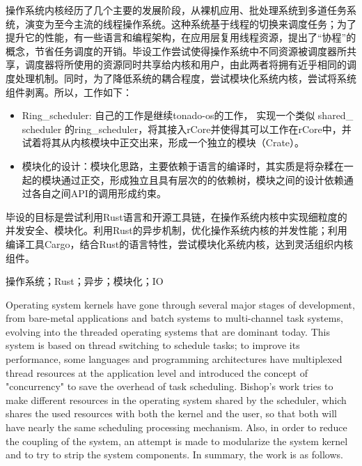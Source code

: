 \setlength{\headheight}{1.5cm}

\abstractcn


操作系统内核经历了几个主要的发展阶段，从裸机应用、批处理系统到多道任务系统，演变为至今主流的线程操作系统。这种系统基于线程的切换来调度任务；为了提升它的性能，有一些语言和编程架构，在应用层复用线程资源，提出了“协程”的概念，节省任务调度的开销。毕设工作尝试使得操作系统中不同资源被调度器所共享，调度器将所使用的资源同时共享给内核和用户，由此两者将拥有近乎相同的调度处理机制。同时，为了降低系统的耦合程度，尝试模块化系统内核，尝试将系统组件剥离。所以，工作如下：

\begin{itemize}
\item Ring\_scheduler: 自己的工作是继续tonado-os的工作， 实现一个类似 shared\_ scheduler 的ring\_scheduler，将其接入rCore并使得其可以工作在rCore中，并试着将其从内核模块中正交出来，形成一个独立的模块（Crate）。 

\item 模块化的设计：模块化思路，主要依赖于语言的编译时，其实质是将杂糅在一起的模块通过正交，形成独立且具有层次的的依赖树，模块之间的设计依赖通过各自之间API的调用形成约束。
\end{itemize}


毕设的目标是尝试利用Rust语言和开源工具链，在操作系统内核中实现细粒度的并发安全、模块化。利用Rust的异步机制，优化操作系统内核的并发性能；利用编译工具Cargo，结合Rust的语言特性，尝试模块化系统内核，达到灵活组织内核组件。

\keywordscn\quad 操作系统；Rust；异步；模块化；IO
\abstracten

Operating system kernels have gone through several major stages of development, from bare-metal applications and batch systems to multi-channel
task systems, evolving into the threaded operating systems that are dominant today. This system is based on thread switching to schedule tasks; to improve its performance, some languages and programming architectures have multiplexed thread resources at the application level and introduced the concept of "concurrency" to save the overhead of task scheduling. Bishop's work tries to make different resources in the operating system shared by the scheduler, which shares the used resources with both the kernel and the user, so that both will have nearly the same scheduling processing mechanism. Also, in order to reduce the coupling of the system, an attempt is made to modularize the system kernel and to try to strip the system components. In summary, the work is as follows.

